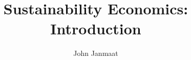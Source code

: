 \documentclass[10pt, aspectratio=169]{beamer}
\title{Sustainability Economics: Introduction}
\author{John Janmaat}
\begin{document}
	
	\frame{\titlepage}
	
	
	
\end{document}
